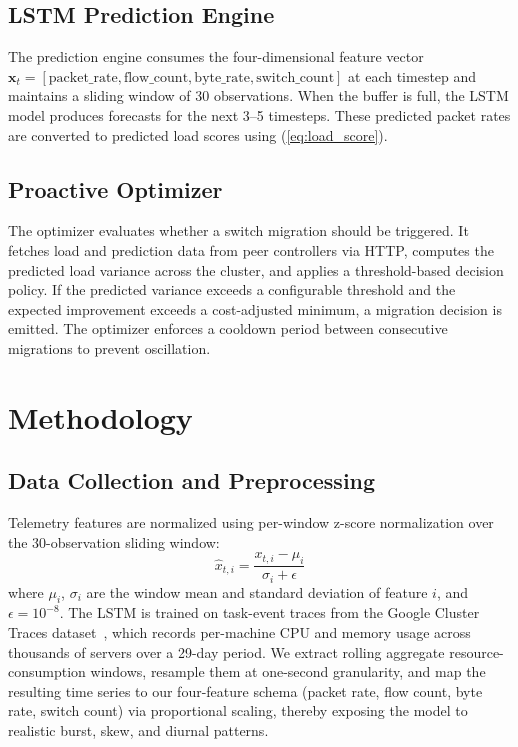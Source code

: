 \documentclass[conference]{IEEEtran}
\begin{document}
\subsection{LSTM Prediction Engine}

The prediction engine consumes the four-dimensional feature vector $\mathbf{x}_t = [\text{packet\_rate}, \text{flow\_count}, \text{byte\_rate}, \text{switch\_count}]$ at each timestep and maintains a sliding window of 30 observations. When the buffer is full, the LSTM model produces forecasts for the next 3--5 timesteps. These predicted packet rates are converted to predicted load scores using (\ref{eq:load_score}).

\subsection{Proactive Optimizer}

The optimizer evaluates whether a switch migration should be triggered. It fetches load and prediction data from peer controllers via HTTP, computes the predicted load variance across the cluster, and applies a threshold-based decision policy. If the predicted variance exceeds a configurable threshold and the expected improvement exceeds a cost-adjusted minimum, a migration decision is emitted. The optimizer enforces a cooldown period between consecutive migrations to prevent oscillation.

\section{Methodology}

\subsection{Data Collection and Preprocessing}

Telemetry features are normalized using per-window z-score normalization over the 30-observation sliding window:
\begin{equation}
\hat{x}_{t,i} = \frac{x_{t,i} - \mu_i}{\sigma_i + \epsilon}
\label{eq:zscore}
\end{equation}
where $\mu_i$, $\sigma_i$ are the window mean and standard deviation of feature $i$, and $\epsilon = 10^{-8}$. The LSTM is trained on task-event traces from the Google Cluster Traces dataset~\cite{googlecluster2011}, which records per-machine CPU and memory usage across thousands of servers over a 29-day period. We extract rolling aggregate resource-consumption windows, resample them at one-second granularity, and map the resulting time series to our four-feature schema (packet rate, flow count, byte rate, switch count) via proportional scaling, thereby exposing the model to realistic burst, skew, and diurnal patterns.
\end{document}

